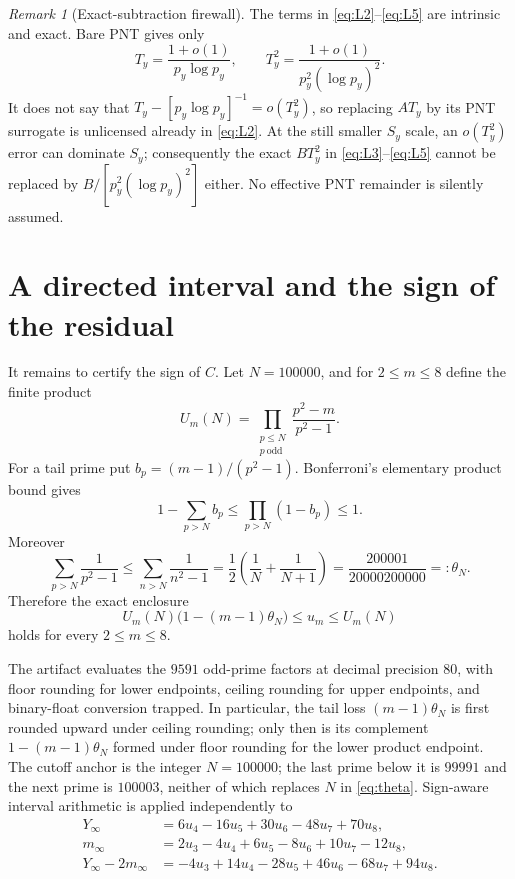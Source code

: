 \documentclass[11pt]{article}
\theoremstyle{definition}
\theoremstyle{remark}
\newtheorem{remark}[theorem]{Remark}
\begin{document}
\begin{remark}[Exact-subtraction firewall]
The terms in \eqref{eq:L2}--\eqref{eq:L5} are intrinsic and exact.  Bare
PNT gives only
\[
 T_y=\frac{1+o(1)}{p_y\log p_y},\qquad
 T_y^2=\frac{1+o(1)}{p_y^2(\log p_y)^2}.
\]
It does not say that
$T_y-[p_y\log p_y]^{-1}=o(T_y^2)$, so replacing $AT_y$ by its PNT
surrogate is unlicensed already in \eqref{eq:L2}.  At the still smaller
$S_y$ scale, an $o(T_y^2)$ error can dominate $S_y$; consequently the
exact $BT_y^2$ in \eqref{eq:L3}--\eqref{eq:L5} cannot be replaced by
$B/[p_y^2(\log p_y)^2]$ either.  No effective PNT remainder is silently
assumed.
\end{remark}

\section{A directed interval and the sign of the residual}
\label{sec:interval}

It remains to certify the sign of $C$.  Let $N=100000$, and for
$2\le m\le8$ define the finite product
\[
 U_m(N)=\prod_{\substack{p\le N\\p\ \mathrm{odd}}}
 \frac{p^2-m}{p^2-1}.
\]
For a tail prime put $b_p=(m-1)/(p^2-1)$.  Bonferroni's elementary
product bound gives
\[
 1-\sum_{p>N}b_p\le\prod_{p>N}(1-b_p)\le1.
\]
Moreover
\begin{equation}
 \sum_{p>N}\frac1{p^2-1}
 \le\sum_{n>N}\frac1{n^2-1}
 =\frac12\left(\frac1N+\frac1{N+1}\right)
 =\frac{200001}{20000200000}=:\theta_N.
 \label{eq:theta}
\end{equation}
Therefore the exact enclosure
\begin{equation}
 U_m(N)\bigl(1-(m-1)\theta_N\bigr)
 \le u_m\le U_m(N)
 \label{eq:um-interval}
\end{equation}
holds for every $2\le m\le8$.

The artifact evaluates the $9591$ odd-prime factors at decimal precision
$80$, with floor rounding for lower endpoints, ceiling rounding for upper
endpoints, and binary-float conversion trapped.  In particular, the tail
loss $(m-1)\theta_N$ is first rounded upward under ceiling rounding; only
then is its complement $1-(m-1)\theta_N$ formed under floor rounding for
the lower product endpoint.  The cutoff anchor is the
integer $N=100000$; the last prime below it is $99991$ and the next prime is
$100003$, neither of which replaces $N$ in \eqref{eq:theta}.  Sign-aware
interval arithmetic is applied independently to
\begin{align*}
 Y_\infty&=6u_4-16u_5+30u_6-48u_7+70u_8,\\
 m_\infty&=2u_3-4u_4+6u_5-8u_6+10u_7-12u_8,\\
 Y_\infty-2m_\infty&=-4u_3+14u_4-28u_5+46u_6-68u_7+94u_8.
\end{align*}
\end{document}
